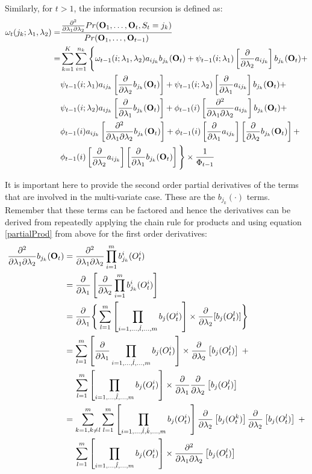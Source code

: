 \documentclass[a4paper,man,nobf]{apa}
\newcommand{\vc}{\mathbf}
\begin{document}
Similarly, for $t>1$, the information recursion is defined as:
\begin{align}
\begin{split}
	\omega_{t}(j_{k};\lambda_{1},\lambda_{2}) =  
	&\frac{\fps Pr(\vc{O}_{1}, \ldots, 
\vc{O}_{t},S_{t}=j_{k})}{Pr(\vc{O}_{1}, \ldots, \vc{O}_{t-1})}
	\\ = &\sum_{k=1}^{K} \sum_{i=1}^{n_{k}} \Bigg\{ 
	\omega_{t-1}(i;\lambda_{1},\lambda_{2}) a_{ij_{k}} 
b_{j_{k}}(\vc{O}_{t}) +
	\psi_{t-1}(i;\lambda_{1}) \left[ \fpt a_{ij_{k}} \right] 
b_{j_{k}}(\vc{O}_{t}) +
	\\  &\psi_{t-1}(i;\lambda_{1})  a_{ij_{k}}  \left[ \fpt 
b_{j_{k}}(\vc{O}_{t}) \right] +
	\psi_{t-1}(i;\lambda_{2}) \left[ \fpp a_{ij_{k}} \right] 
b_{j_{k}}(\vc{O}_{t}) + 
	\\ & \psi_{t-1}(i;\lambda_{2}) a_{ij_{k}} \left[ \fpp 
b_{j_{k}}(\vc{O}_{t})\right]  + 
	\phi_{t-1}(i) \left[ \fps a_{ij_{k}} \right]  b_{j_{k}}(\vc{O}_{t}) +
	\\ & \phi_{t-1}(i) a_{ij_{k}} \left[ \fps b_{j_{k}}(\vc{O}_{t}) 
\right]  +
	\phi_{t-1}(i) \left[ \fpp a_{ij_{k}} \right] \left[ \fpt 
b_{j_{k}}(\vc{O}_{t}) \right]  +
	\\ & \phi_{t-1}(i) \left[ \fpt a_{ij_{k}}\right] \left[ \fpp 
b_{j_{k}}(\vc{O}_{t}) \right]  \Bigg\} 
	\times \frac{1}{\Phi_{t-1}}
\end{split}
\end{align}

It is important here to provide the second order partial derivatives 
of the terms that are involved in the multi-variate case. These are 
the $b_{j_{k}}(\cdot)$ terms. Remember that these terms can be 
factored and hence the derivatives can be derived from repeatedly 
applying the chain rule for products and using equation 
\ref{partialProd} from above for the first order derivatives: 
\begin{align}
\begin{split}
	\fps b_{j_{k}} (\vc{O}_{t}) & = \fps \prod_{i=1}^{m} b_{j_{k}}^{i} 
(O_{t}^{i}) 
	\\ & = \fpp \left[ \fpt \prod_{i=1}^{m} b_{j_{k}}^{i} (O_{t}^{i})  
\right] 
	\\ & = \fpp \Bigg\{ \sum_{l=1}^{m} \left[ \prod_{i=1, \ldots, 
\hat{l}, \ldots, m} b_{j}(O_{t}^{i}) 
	\right] \times \fpt  [b_{j}(O_{t}^{l})] \Bigg\}  
	\\ & = \sum_{l=1}^{m} \left[ \fpp \prod_{i=1, \ldots, \hat{l}, 
\ldots, m} b_{j}(O_{t}^{i}) \right] 
	\times \fpt  \left[ b_{j}(O_{t}^{l}) \right] \; + 
	\\ &\phantom{=}\;\,  \sum_{l=1}^{m}  \left[ \prod_{i=1, \ldots, 
\hat{l}, \ldots, m} b_{j}(O_{t}^{i}) 
	\right] \times \fpp \fpt  \left[ b_{j}(O_{t}^{l})\right]  
	\\ & = \sum_{k=1,k\neq	l}^{m} \sum_{l=1}^{m}  \left[ \prod_{i=1, 
\ldots, \hat{l}, \hat{k}, \ldots, m}
	b_{j}(O_{t}^{i}) \right] \fpt  \left[ b_{j}(O_{t}^{k})\right]  \fpt  
\left[ b_{j}(O_{t}^{l})\right] \;+ 
	\\ &\phantom{=}\;\, \sum_{l=1}^{m}  \left[ \prod_{i=1, \ldots, 
\hat{l}, \ldots, m} b_{j}(O_{t}^{i}) 
	\right] \times \fps  \left[b_{j}(O_{t}^{l}) \right] 
\end{split}
\end{align}
\end{document}
